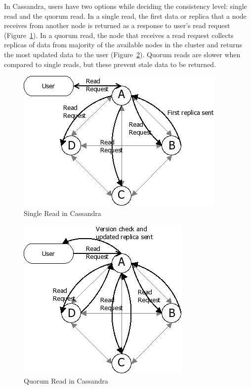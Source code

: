 \begin{description}
  
  In Cassandra, users have two options while deciding the consistency level:
  single read and the quorum read. In a single read, the first data or replica
  that a node receives from another node is returned as a response to user's
  read request (Figure~\ref{f:singleread}). In a  quorum read, the node that
  receives a read request collects   replicas of data from majority of the available nodes in
  the cluster and returns the most updated data to the user (Figure~\ref{f:quorumread}).
  Quorum reads are slower when compared to single reads, but these prevent stale
  data to be returned.
  
    
  		 \begin{figure}[H]
			\centering
			\includegraphics[width=.5\textwidth]{./figure/Cassandra/Single-Read-Cassandra.png}
		
			\caption{Single Read in Cassandra}\label{f:singleread}
		\end{figure}
 
		 \begin{figure}[H]
			\centering
			\includegraphics[width=.4\textwidth]{./figure/Cassandra/Quorum-read-Cassandra.png}
		
			\caption{Quorum Read in Cassandra}\label{f:quorumread}
		\end{figure}



\end{description}
